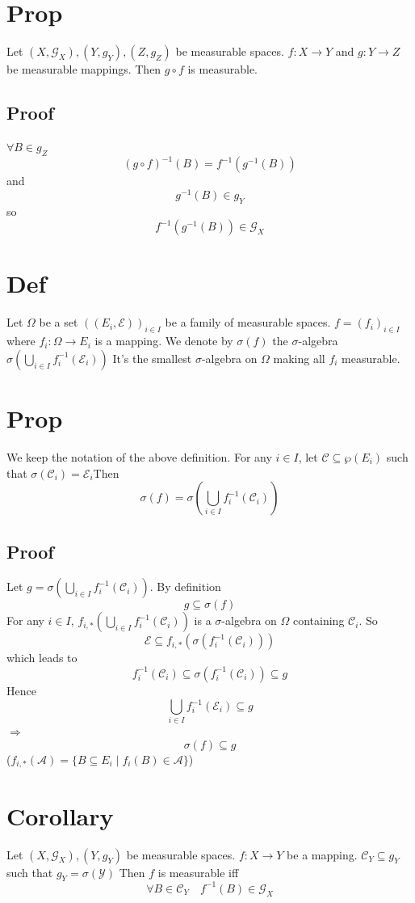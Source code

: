 \documentclass{book}
\begin{document}
\section{Prop}
Let $(X,\mathcal{G}_X),(Y,g_Y),(Z,g_Z)$ be measurable spaces. $f:X\rightarrow Y$ and $g:Y\rightarrow Z$ be measurable mappings. Then $g\circ f$ is measurable.
\subsection*{Proof}
$\forall B\in g_Z$$$(g\circ f)^{-1}(B)=f^{-1}(g^{-1}(B))$$and $$g^{-1}(B)\in g_Y$$ so $$f^{-1}(g^{-1}(B))\in \mathcal{G}_X$$
\section{Def}
Let $\Omega$ be a set $((E_i,\mathcal{E}))_{i\in I}$ be a family of measurable spaces. $f=(f_i)_{i\in I}$ where $f_i:\Omega\rightarrow E_i$ is a mapping. We denote by $\sigma(f)$ the $\sigma$-algebra $\sigma(\bigcup\limits_{i\in I} f_i^{-1}(\mathcal{E}_i))$ It's the smallest $\sigma$-algebra on $\Omega$ making all $f_i$ measurable.
\section{Prop}
We keep the notation of the above definition. For any $i\in I$, let $\mathcal{C}\subseteq\wp(E_i)$ such that $\sigma(\mathcal{C}_i)=\mathcal{E}_i$Then $$\sigma(f)=\sigma(\bigcup\limits_{i\in I}f_i^{-1}(\mathcal{C}_i))$$
\subsection*{Proof}
Let $g=\sigma(\bigcup\limits_{i\in I}f_i^{-1}(\mathcal{C}_i))$. By definition$$g\subseteq \sigma(f)$$
For any $i\in I$, $f_{i,*}(\bigcup\limits_{i\in I}f_i^{-1}(\mathcal{C}_i))$ is a $\sigma$-algebra on $\Omega$ containing $\mathcal{C}_i$. So $$\mathcal{E}\subseteq f_{i,*}(\sigma(f_i^{-1}(\mathcal{C}_i)))$$
which leads to$$f_i^{-1}(\mathcal{C}_i)\subseteq \sigma(f_i^{-1}(\mathcal{C}_i))\subseteq g$$Hence
$$\bigcup\limits_{i\in I}f_i^{-1}(\mathcal{E}_i)\subseteq g$$$\Rightarrow$$$\sigma(f)\subseteq g$$
($f_{i,*}(\mathcal{A})=\{B\subseteq E_i\mid f_i(B)\in \mathcal{A}\}$)
\section{Corollary}
Let $(X,\mathcal{G}_X),(Y,g_Y)$ be measurable spaces. $f:X\rightarrow Y$ be a mapping. $\mathcal{C}_Y\subseteq g_Y$ such that $g_Y=\sigma(\mathcal{Y})$ Then $f$ is measurable iff $$\forall B\in \mathcal{C}_Y\quad f^{-1}(B)\in \mathcal{G}_X$$
\end{document}
